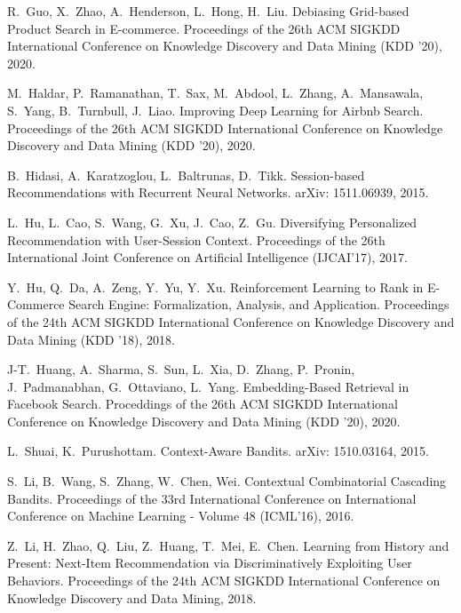 \documentclass[11pt, dvipdfmx]{article}
\begin{document}
\begin{thebibliography}{10}
\begin{small}
 R.~Guo, X.~Zhao, A.~Henderson, L.~Hong, H.~Liu.
\newblock Debiasing Grid-based Product Search in E-commerce.
\newblock Proceedings of the 26th ACM SIGKDD International Conference on Knowledge Discovery and Data Mining (KDD '20), 2020.

 M.~Haldar, P.~Ramanathan, T.~Sax, M.~Abdool, L.~Zhang, A.~Mansawala, S.~Yang, B.~Turnbull, J.~Liao.
\newblock Improving Deep Learning for Airbnb Search.
\newblock Proceedings of the 26th ACM SIGKDD International Conference on Knowledge Discovery and Data Mining (KDD '20), 2020.

 B.~Hidasi, A.~Karatzoglou, L.~Baltrunas, D.~Tikk.
\newblock Session-based Recommendations with Recurrent Neural Networks.
\newblock arXiv: 1511.06939, 2015.

 L.~Hu, L.~Cao, S.~Wang, G.~Xu, J.~Cao, Z.~Gu.
\newblock Diversifying Personalized Recommendation with User-Session Context.
\newblock Proceedings of the 26th International Joint Conference on Artificial Intelligence (IJCAI’17), 2017.


 Y.~Hu, Q.~Da, A.~Zeng, Y.~Yu, Y.~Xu.
\newblock Reinforcement Learning to Rank in E-Commerce Search Engine: Formalization, Analysis, and Application.
\newblock Proceedings of the 24th ACM SIGKDD International Conference on Knowledge Discovery and Data Mining (KDD ’18), 2018.

 J-T.~Huang, A.~Sharma, S.~Sun, L.~Xia, D.~Zhang, P.~Pronin, J.~Padmanabhan, G.~Ottaviano, L.~Yang.
\newblock Embedding-Based Retrieval in Facebook Search. 
\newblock Proceddings of the 26th ACM SIGKDD International Conference on Knowledge Discovery and Data Mining (KDD '20), 2020. 

 L.~Shuai, K.~Purushottam.
\newblock Context-Aware Bandits.
\newblock arXiv: 1510.03164, 2015.

S.~Li, B.~Wang, S.~Zhang, W.~Chen, Wei.
\newblock Contextual Combinatorial Cascading Bandits.
\newblock Proceedings of the 33rd International Conference on International Conference on Machine Learning - Volume 48 (ICML'16), 2016.

 Z.~Li,  H.~Zhao, Q.~Liu, Z.~Huang, T.~Mei, E.~Chen. \newblock Learning from History and Present: Next-Item Recommendation via Discriminatively Exploiting User Behaviors. \newblock Proceedings of the 24th ACM SIGKDD International Conference on Knowledge Discovery and Data Mining, 2018.


\end{small}
\end{thebibliography}
\end{document}
